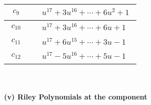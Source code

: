 \documentclass[1p]{elsarticle_modified}
\theoremstyle{definition}
\begin{document}
\begin{tabular}{m{50pt}|m{274pt}}
\hline $$\begin{aligned}c_{9}\end{aligned}$$&$\begin{aligned}
&u^{17}+3 u^{16}+\cdots+6 u^2+1
\end{aligned}$\\
\hline $$\begin{aligned}c_{10}\end{aligned}$$&$\begin{aligned}
&u^{17}+3 u^{16}+\cdots+6 u+1
\end{aligned}$\\
\hline $$\begin{aligned}c_{11}\end{aligned}$$&$\begin{aligned}
&u^{17}+6 u^{15}+\cdots+3 u-1
\end{aligned}$\\
\hline $$\begin{aligned}c_{12}\end{aligned}$$&$\begin{aligned}
&u^{17}-5 u^{16}+\cdots+5 u-1
\end{aligned}$\\
\hline
\end{tabular}\\~\\
\newpage\renewcommand{\arraystretch}{1}
\flushleft \textbf{(v) Riley Polynomials at the component}\newline \\
\end{document}
